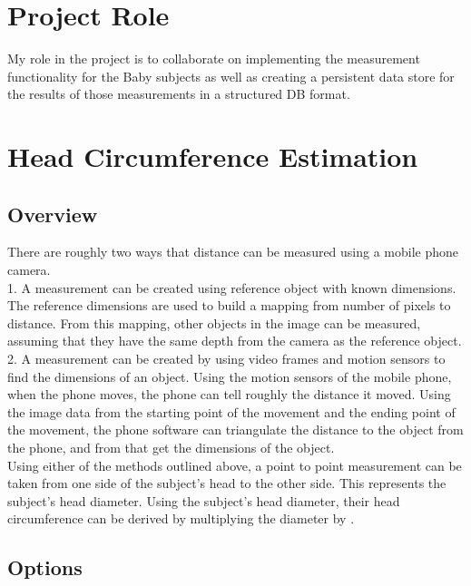 \documentclass[onecolumn, draftclsnofoot,10pt, compsoc]{IEEEtran}
\begin{document}
\section{Project Role}
My role in the project is to collaborate on implementing the measurement functionality for the Baby subjects as well as creating a persistent data store for the results of those measurements in a structured DB format.

\section{Head Circumference Estimation} 

\subsection{Overview}
There are roughly two ways that distance can be measured using a mobile phone camera.\\

1. A measurement can be created using reference object with known dimensions. The reference dimensions are used to build a mapping from number of pixels to distance. From this mapping, other objects in the image can be measured, assuming that they have the same depth from the camera as the reference object\cite{openCV}.\\

2. A measurement can be created by using video frames and motion sensors to find the dimensions of an object. Using the motion sensors of the mobile phone, when the phone moves, the phone can tell roughly the distance it moved. Using the image data from the starting point of the movement and the ending point of the movement, the phone software can triangulate the distance to the object from the phone, and from that get the dimensions of the object.\\

Using either of the methods outlined above, a point to point measurement can be taken from one side of the subject's head to the other side. This represents the subject's head diameter. Using the subject's head diameter, their head circumference can be derived by multiplying the diameter by \pi.

\subsection{Options}
\end{document}
